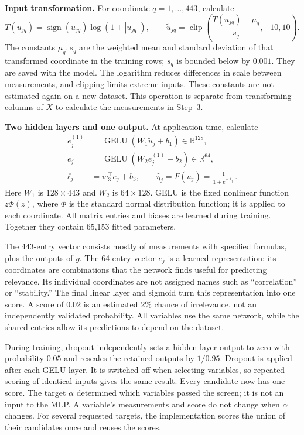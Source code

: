 \documentclass[10pt,letterpaper]{article}
\newcommand{\R}{\mathbb{R}}
\begin{document}
\textbf{Input transformation.} For coordinate $q=1,\ldots,443$, calculate
\[
 T(u_{jq})=\operatorname{sign}(u_{jq})\log(1+|u_{jq}|),\qquad
 \widetilde u_{jq}=\operatorname{clip}
 \left(\frac{T(u_{jq})-\mu_q}{s_q},-10,10\right).
\]
The constants $\mu_q,s_q$ are the weighted mean and standard deviation of
that transformed coordinate in the training rows; $s_q$ is bounded below
by $0.001$. They are saved with the model. The logarithm reduces differences
in scale between measurements, and clipping limits extreme inputs.
These constants are not estimated again on a new dataset. This operation
is separate from transforming columns of $X$ to calculate the measurements
in Step~3.

\textbf{Two hidden layers and one output.} At application time, calculate
\begin{align*}
 e_j^{(1)}&=\operatorname{GELU}(W_1\widetilde u_j+b_1)\in\R^{128},\\
 e_j&=\operatorname{GELU}(W_2e_j^{(1)}+b_2)\in\R^{64},\\
 \ell_j&=w_3^\top e_j+b_3,\qquad
 \widehat\eta_j=F(u_j)=\frac{1}{1+e^{-\ell_j}}.
\end{align*}
Here $W_1$ is $128\times443$ and $W_2$ is $64\times128$.
GELU is the fixed nonlinear function $z\Phi(z)$, where $\Phi$ is the
standard normal distribution function; it is applied to each coordinate.
All matrix entries and biases are learned during training. Together they
contain 65,153 fitted parameters.

The 443-entry vector consists mostly of measurements with specified
formulas, plus the outputs of $g$. The 64-entry vector $e_j$ is a learned
representation: its coordinates are combinations that the network finds
useful for predicting relevance. Its individual coordinates are not assigned
names such as ``correlation'' or ``stability.'' The final linear layer and
sigmoid turn this representation into one score. A score of $0.02$ is an
estimated $2\%$ chance of irrelevance, not an independently validated
probability. All variables use the same network, while the shared entries
allow its predictions to depend on the dataset.

During training, dropout independently sets a hidden-layer output to zero
with probability $0.05$ and rescales the retained outputs by $1/0.95$.
Dropout is applied after each GELU layer. It is switched off when selecting
variables, so repeated scoring of identical inputs gives the same result.
Every candidate now has one score. The target $\alpha$ determined which
variables passed the screen; it is not an input to the MLP. A variable's
measurements and score do not change when $\alpha$ changes. For several
requested targets, the implementation scores the union of their candidates
once and reuses the scores.
\end{document}
